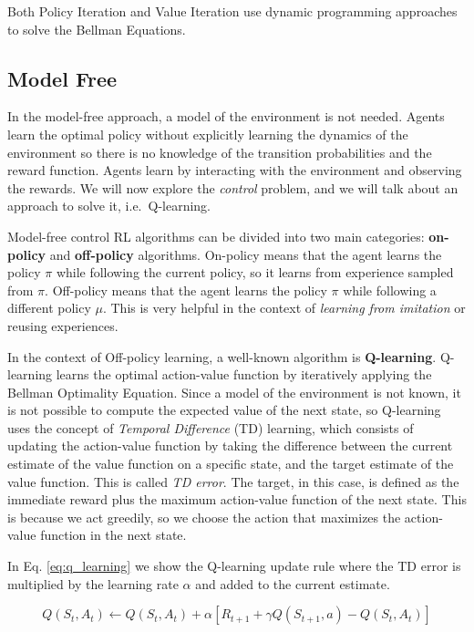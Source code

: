 Both Policy Iteration and Value Iteration use dynamic programming approaches to solve the Bellman Equations.

\subsection{Model Free}
\label{subsec:model_free_rl}
In the model-free approach, a model of the environment is not needed.
Agents learn the optimal policy without explicitly learning the dynamics of the environment so there is no knowledge of the transition probabilities and the reward function.
Agents learn by interacting with the environment and observing the rewards.
We will now explore the \textit{control} problem, and we will talk about an approach to solve it, i.e.\ Q-learning.


Model-free control RL algorithms can be divided into two main categories: \textbf{on-policy} and \textbf{off-policy} algorithms.
On-policy means that the agent learns the policy $\pi$ while following the current policy, so it learns from experience sampled from $\pi$.
Off-policy means that the agent learns the policy $\pi$ while following a different policy $\mu$.
This is very helpful in the context of \textit{learning from imitation} or reusing experiences.

In the context of Off-policy learning, a well-known algorithm is \textbf{Q-learning}.
Q-learning learns the optimal action-value function by iteratively applying the Bellman Optimality Equation.
Since a model of the environment is not known, it is not possible to compute the expected value of the next state, so Q-learning uses the concept of \textit{Temporal Difference} (TD) learning, which consists of updating the action-value function by taking the difference between the current estimate of the value function on a specific state, and the target estimate of the value function.
This is called \textit{TD error}.
The target, in this case, is defined as the immediate reward plus the maximum action-value function of the next state.
This is because we act greedily, so we choose the action that maximizes the action-value function in the next state.

In Eq. \ref{eq:q_learning} we show the Q-learning update rule where the TD error is multiplied by the learning rate $\alpha$ and added to the current estimate.

\begin{equation} \label{eq:q_learning}
    Q(S_t, A_t) \leftarrow Q(S_t, A_t) + \alpha [R_{t+1} + \gamma Q(S_{t+1}, a) - Q(S_t, A_t)]
\end{equation}

